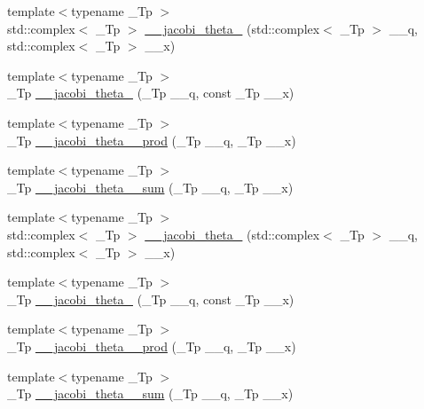 \begin{DoxyCompactItemize}
\item 
{\footnotesize template$<$typename \+\_\+\+Tp $>$ }\\std\+::complex$<$ \+\_\+\+Tp $>$ \hyperlink{namespacestd_1_1____detail_aba908b579191a0c5f55be7db84ece5c5}{\+\_\+\+\_\+jacobi\+\_\+theta\+\_} (std\+::complex$<$ \+\_\+\+Tp $>$ \+\_\+\+\_\+q, std\+::complex$<$ \+\_\+\+Tp $>$ \+\_\+\+\_\+x)
\item 
{\footnotesize template$<$typename \+\_\+\+Tp $>$ }\\\+\_\+\+Tp \hyperlink{namespacestd_1_1____detail_a5aace3bea7c88443d5bceb503a0452d0}{\+\_\+\+\_\+jacobi\+\_\+theta\+\_} (\+\_\+\+Tp \+\_\+\+\_\+q, const \+\_\+\+Tp \+\_\+\+\_\+x)
\item 
{\footnotesize template$<$typename \+\_\+\+Tp $>$ }\\\+\_\+\+Tp \hyperlink{namespacestd_1_1____detail_acc790f257c25f021704f9c9e1ad9df29}{\+\_\+\+\_\+jacobi\+\_\+theta\+\_\+\_\+prod} (\+\_\+\+Tp \+\_\+\+\_\+q, \+\_\+\+Tp \+\_\+\+\_\+x)
\item 
{\footnotesize template$<$typename \+\_\+\+Tp $>$ }\\\+\_\+\+Tp \hyperlink{namespacestd_1_1____detail_a6eba88f5f854974b7fe7445e9b11a0e0}{\+\_\+\+\_\+jacobi\+\_\+theta\+\_\+\_\+sum} (\+\_\+\+Tp \+\_\+\+\_\+q, \+\_\+\+Tp \+\_\+\+\_\+x)
\item 
{\footnotesize template$<$typename \+\_\+\+Tp $>$ }\\std\+::complex$<$ \+\_\+\+Tp $>$ \hyperlink{namespacestd_1_1____detail_ac7a6c396a102438d2c104f344b4f6a72}{\+\_\+\+\_\+jacobi\+\_\+theta\+\_} (std\+::complex$<$ \+\_\+\+Tp $>$ \+\_\+\+\_\+q, std\+::complex$<$ \+\_\+\+Tp $>$ \+\_\+\+\_\+x)
\item 
{\footnotesize template$<$typename \+\_\+\+Tp $>$ }\\\+\_\+\+Tp \hyperlink{namespacestd_1_1____detail_a6a7102085368188062ef47100ce80239}{\+\_\+\+\_\+jacobi\+\_\+theta\+\_} (\+\_\+\+Tp \+\_\+\+\_\+q, const \+\_\+\+Tp \+\_\+\+\_\+x)
\item 
{\footnotesize template$<$typename \+\_\+\+Tp $>$ }\\\+\_\+\+Tp \hyperlink{namespacestd_1_1____detail_aef15a9b55f5f4ed8b1f6d6113ad0ef12}{\+\_\+\+\_\+jacobi\+\_\+theta\+\_\+\_\+prod} (\+\_\+\+Tp \+\_\+\+\_\+q, \+\_\+\+Tp \+\_\+\+\_\+x)
\item 
{\footnotesize template$<$typename \+\_\+\+Tp $>$ }\\\+\_\+\+Tp \hyperlink{namespacestd_1_1____detail_a07e080795e7f80c5a0b733d6bac49675}{\+\_\+\+\_\+jacobi\+\_\+theta\+\_\+\_\+sum} (\+\_\+\+Tp \+\_\+\+\_\+q, \+\_\+\+Tp \+\_\+\+\_\+x)

\end{DoxyCompactItemize}
